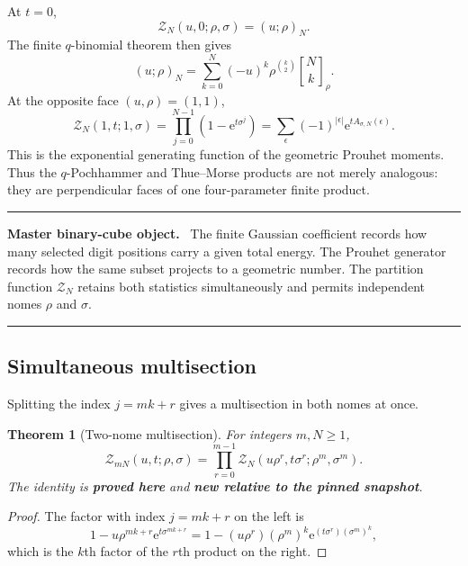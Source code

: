 \documentclass[11pt,oneside]{article}
\numberwithin{equation}{section}
\newtheorem{theorem}{Theorem}[section]
\theoremstyle{definition}
\theoremstyle{remark}
\newcommand{\e}{\mathrm e}
\newcommand{\qbinom}[3]{\genfrac{[}{]}{0pt}{}{#1}{#2}_{#3}}
\newcommand{\proved}{\textcolor{deepgreen}{\textbf{proved here}}}
\newcommand{\auditnew}{\textcolor{deepviolet}{\textbf{new relative to the pinned snapshot}}}
\newcommand{\Zpart}{\mathscr Z}
\newenvironment{resultbox}[1]{%
  \par\medskip\noindent\begin{center}\begin{minipage}{0.94\textwidth}%
  \color{deepgreen}\hrule\vspace{0.65em}%
  \color{black}\textbf{\color{deepgreen}#1.}\ }{%
  \par\vspace{0.65em}\color{deepgreen}\hrule
  \end{minipage}\end{center}\medskip}
\begin{document}
At $t=0$,
\begin{equation}
 \Zpart_N(u,0;\rho,\sigma)=(u;\rho)_N.
 \label{eq:Z-Pochhammer-face}
\end{equation}
The finite $q$-binomial theorem then gives
\begin{equation}
 (u;\rho)_N
 =\sum_{k=0}^{N}(-u)^k\rho^{\binom k2}
 \qbinom{N}{k}{\rho}.
 \label{eq:finite-q-binomial}
\end{equation}
At the opposite face $(u,\rho)=(1,1)$,
\begin{equation}
 \Zpart_N(1,t;1,\sigma)
 =\prod_{j=0}^{N-1}\left(1-\e^{t\sigma^j}\right)
 =\sum_{\epsilon}(-1)^{|\epsilon|}
 \e^{tA_{\sigma,N}(\epsilon)}.
 \label{eq:Z-Prouhet-face}
\end{equation}
This is the exponential generating function of the geometric Prouhet moments.
Thus the $q$-Pochhammer and Thue--Morse products are not merely analogous:
they are perpendicular faces of one four-parameter finite product.

\begin{resultbox}{Master binary-cube object}
The finite Gaussian coefficient records how many selected digit positions
carry a given total energy.  The Prouhet generator records how the same subset
projects to a geometric number.  The partition function $\Zpart_N$ retains both
statistics simultaneously and permits independent nomes $\rho$ and $\sigma$.
\end{resultbox}

\subsection{Simultaneous multisection}

Splitting the index $j=mk+r$ gives a multisection in both nomes at once.

\begin{theorem}[Two-nome multisection]
\label{thm:Z-multisection}
For integers $m,N\ge1$,
\begin{equation}
 \boxed{
 \Zpart_{mN}(u,t;\rho,\sigma)
 =\prod_{r=0}^{m-1}
 \Zpart_N\!\left(u\rho^r,t\sigma^r;\rho^m,\sigma^m\right).}
 \label{eq:Z-multisection}
\end{equation}
The identity is \proved{} and \auditnew.
\end{theorem}

\begin{proof}
The factor with index $j=mk+r$ on the left is
\[
 1-u\rho^{mk+r}\e^{t\sigma^{mk+r}}
 =1-(u\rho^r)(\rho^m)^k
   \e^{(t\sigma^r)(\sigma^m)^k},
\]
which is the $k$th factor of the $r$th product on the right.
\end{proof}
\end{document}
